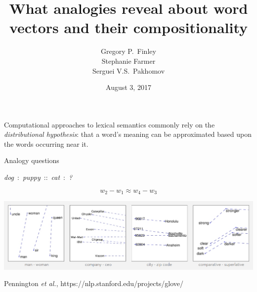 \documentclass{beamer}
\title[What analogies reveal]{What analogies reveal about word vectors and their compositionality}
\author{Gregory P.~Finley\\Stephanie Farmer\\Serguei V.S.~Pakhomov}
\institute{The Sixth Joint Conference on Lexical and Computational Semantics}
\date{August 3, 2017}
\newcommand{\analogy}[4]{\emph{#1}~:~\emph{#2}~::~\emph{#3}~:~\emph{#4}}
\begin{document}
 
\begin{frame}
  \titlepage
\end{frame}

\begin{frame}

Computational approaches to lexical semantics commonly rely on the \emph{distributional hypothesis}: that a word's meaning can be approximated based upon the words occurring near it.


\end{frame}

\begin{frame}{Analogy questions}

\centering
\analogy{dog}{puppy}{cat}{?}

\end{frame}

\begin{frame}
\[w_2 - w_1 \approx w_4 - w_3\]

\vspace{1cm}
\centering
\includegraphics[scale=.225]{glove-space.png}
\flushright

\vspace{-.5cm}
\begin{tiny}
Pennington \emph{et al.}, https://nlp.stanford.edu/projects/glove/
\end{tiny}
\end{frame}
\end{document}
